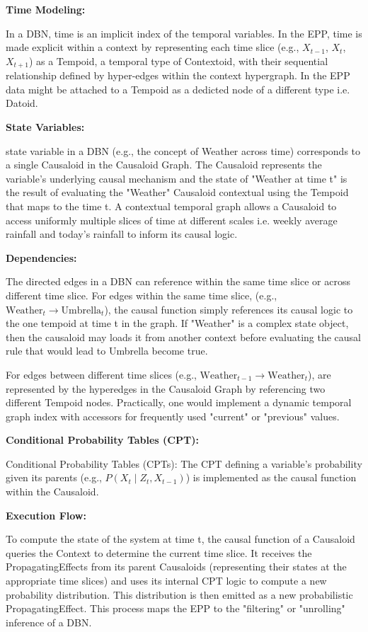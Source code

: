 \textbf{Time Modeling:}

In a DBN, time is an implicit index of the temporal variables. In the EPP, time is made explicit within a
context by representing each time slice (e.g., $X_{t-1}$, $X_t$, $X_{t+1}$) as a Tempoid, a temporal type of Contextoid, with their sequential relationship defined by hyper-edges within the context hypergraph. In the EPP data might be attached to a Tempoid as a dedicted node of a different type i.e. Datoid.

\textbf{State Variables:}

state variable in a DBN (e.g., the concept of Weather across time) corresponds to a single Causaloid in the Causaloid Graph. The Causaloid represents the variable's underlying causal mechanism and the state of "Weather at time t" is the result of evaluating the "Weather" Causaloid contextual using the Tempoid that maps to the time t. A contextual temporal graph allows a Causaloid to access uniformly multiple slices of time at different scales i.e. weekly average rainfall and today's rainfall to inform its causal logic.

\textbf{Dependencies:}

The directed edges in a DBN can reference within the same time slice or across different time slice.
For edges within the same time slice, (e.g., $\text{Weather}_t \to \text{Umbrella}_t$), the causal function simply references its causal logic to the one tempoid at time t in the graph. If "Weather" is a complex state object, then the causaloid may loads it from another context before evaluating the causal rule that would lead to Umbrella become true.

For edges between different time slices (e.g., $\text{Weather}_{t-1} \to \text{Weather}_t$),  are represented by the hyperedges in the Causaloid Graph by referencing two different Tempoid nodes. Practically, one would implement a dynamic temporal graph index with accessors for frequently used "current" or "previous" values.


\textbf{Conditional Probability Tables (CPT):}

Conditional Probability Tables (CPTs): The CPT defining a variable's probability given its parents
(e.g., $P(X_t \mid Z_t, X_{t-1})$) is implemented as the causal function within the Causaloid.

\newpage

\textbf{Execution Flow:}

To compute the state of the system at time t, the causal function of a Causaloid queries the Context to determine the current time slice. It receives the PropagatingEffects from its parent Causaloids (representing their states at the appropriate time slices) and uses its internal CPT logic to compute a new probability distribution. This distribution is then emitted as a new probabilistic PropagatingEffect. This process maps the EPP to the "filtering" or "unrolling" inference of a DBN.

